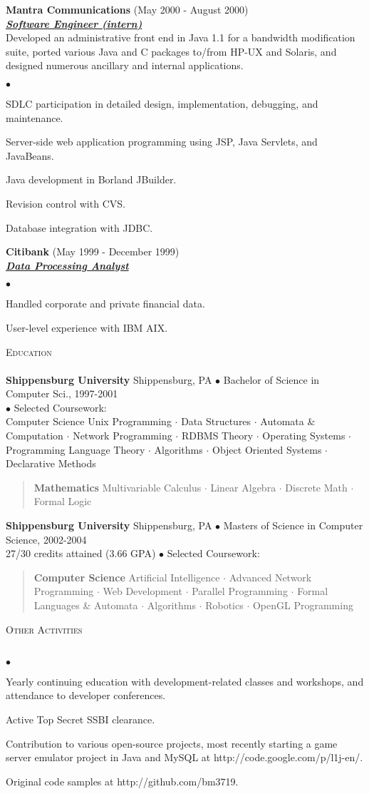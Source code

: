 \documentclass{article}
\newcommand{\area}[2]{\vspace*{-9pt} \begin{verse}\textbf{#1}   #2 \end{verse}  }
\newcommand{\lineunder}{\vspace*{-8pt} \\ \hspace*{-18pt} \hrulefill \\}
\newcommand{\header}[1]{{\hspace*{-15pt}\vspace*{7pt} \textsc{#1}} \vspace*{-7pt} \lineunder}
\newcommand{\employer}[3]{{ \textbf{#1} (#2)\\ \underline{\textbf{\emph{#3}}}\\  }}
\newenvironment{achievements}{\begin{list}{$\bullet$}{\topsep 0pt \itemsep
      -2pt}}{\vspace*{4pt}\end{list}}
\newcommand{\schoolwithcourses}[4]{
\textbf{#1} #2 $\bullet$ #3\\ 
#4 $\bullet$ Selected Coursework:\\
\vspace*{5pt}
}
\begin{document}
\employer{Mantra Communications}{May 2000 - August 2000}{Software Engineer
  (intern)} Developed an administrative front end in Java 1.1 for a bandwidth
modification suite, ported various Java and C packages to/from HP-UX and
Solaris, and designed numerous ancillary and internal applications.
\begin{achievements}
\item SDLC participation in detailed design, implementation, debugging, and
  maintenance.
\item Server-side web application programming using JSP, Java Servlets, and
  JavaBeans.
\item Java development in Borland JBuilder.
\item Revision control with CVS.
\item Database integration with JDBC.
\end{achievements}

\employer{Citibank}{May 1999 - December 1999}{Data Processing Analyst}
\begin{achievements}
\item Handled corporate and private financial data.
\item User-level experience with IBM AIX.
\end{achievements}

\header{Education}

\schoolwithcourses{Shippensburg University}{Shippensburg, PA}{Bachelor of
  Science in Computer Sci., 1997-2001}

\area{Computer Science}{ Unix Programming $\cdot$ Data Structures $\cdot$
  Automata \& Computation $\cdot$ Network Programming $\cdot$ RDBMS Theory
  $\cdot$ Operating Systems $\cdot$ Programming Language Theory $\cdot$
  Algorithms $\cdot$ Object Oriented Systems $\cdot$ Declarative Methods }
\area{Mathematics}{Multivariable Calculus $\cdot$ Linear Algebra $\cdot$
  Discrete Math $\cdot$ Formal Logic }

\schoolwithcourses{Shippensburg University}{Shippensburg, PA}{Masters of
  Science in Computer Science, 2002-2004}{27/30 credits attained (3.66 GPA)}

\area{Computer Science}{ Artificial Intelligence $\cdot$ Advanced Network
  Programming $\cdot$ Web Development $\cdot$ Parallel Programming $\cdot$ Formal
  Languages \& Automata $\cdot$ Algorithms $\cdot$ Robotics $\cdot$ OpenGL
  Programming }

\header{Other Activities}
\begin{achievements}
\item Yearly continuing education with development-related classes and
  workshops, and attendance to developer conferences.
\item Active Top Secret SSBI clearance.
\item Contribution to various open-source projects, most recently starting a
  game server emulator project in Java and MySQL at
  http://code.google.com/p/l1j-en/.
\item Original code samples at http://github.com/bm3719.
\end{achievements}
\end{document}
